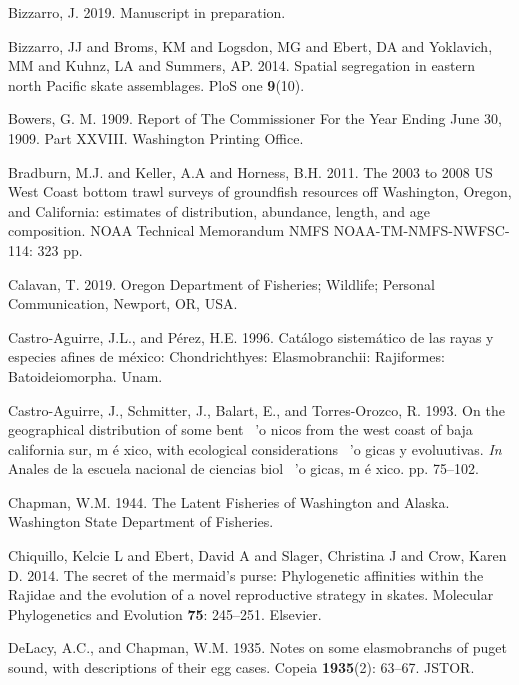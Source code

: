 \documentclass[12pt,]{article}
\begin{document}
\leavevmode\hypertarget{ref-Bizzarro2019}{}%
Bizzarro, J. 2019. Manuscript in preparation.

\leavevmode\hypertarget{ref-Bizzarro2014}{}%
Bizzarro, JJ and Broms, KM and Logsdon, MG and Ebert, DA and Yoklavich,
MM and Kuhnz, LA and Summers, AP. 2014. Spatial segregation in eastern
north Pacific skate assemblages. PloS one \textbf{9}(10).

\leavevmode\hypertarget{ref-Bowers1909}{}%
Bowers, G. M. 1909. Report of The Commissioner For the Year Ending June
30, 1909. Part XXVIII. Washington Printing Office.

\leavevmode\hypertarget{ref-Bradburn2011}{}%
Bradburn, M.J. and Keller, A.A and Horness, B.H. 2011. The 2003 to 2008
US West Coast bottom trawl surveys of groundfish resources off
Washington, Oregon, and California: estimates of distribution,
abundance, length, and age composition. NOAA Technical Memorandum NMFS
NOAA-TM-NMFS-NWFSC-114: 323 pp.

\leavevmode\hypertarget{ref-TedCalavan}{}%
Calavan, T. 2019. Oregon Department of Fisheries; Wildlife; Personal
Communication, Newport, OR, USA.

\leavevmode\hypertarget{ref-Castro1996}{}%
Castro-Aguirre, J.L., and Pérez, H.E. 1996. Catálogo sistemático de las
rayas y especies afines de méxico: Chondrichthyes: Elasmobranchii:
Rajiformes: Batoideiomorpha. Unam.

\leavevmode\hypertarget{ref-Castro1993}{}%
Castro-Aguirre, J., Schmitter, J., Balart, E., and Torres-Orozco, R.
1993. On the geographical distribution of some bent ~'o nicos from the
west coast of baja california sur, m é xico, with ecological
considerations ~'o gicas y evoluutivas. \emph{In} Anales de la escuela
nacional de ciencias biol ~'o gicas, m é xico. pp. 75--102.

\leavevmode\hypertarget{ref-Chapman1944}{}%
Chapman, W.M. 1944. The Latent Fisheries of Washington and Alaska.
Washington State Department of Fisheries.

\leavevmode\hypertarget{ref-Chiquillo2014}{}%
Chiquillo, Kelcie L and Ebert, David A and Slager, Christina J and Crow,
Karen D. 2014. The secret of the mermaid's purse: Phylogenetic
affinities within the Rajidae and the evolution of a novel reproductive
strategy in skates. Molecular Phylogenetics and Evolution \textbf{75}:
245--251. Elsevier.

\leavevmode\hypertarget{ref-DeLacy1935}{}%
DeLacy, A.C., and Chapman, W.M. 1935. Notes on some elasmobranchs of
puget sound, with descriptions of their egg cases. Copeia
\textbf{1935}(2): 63--67. JSTOR.
\end{document}
